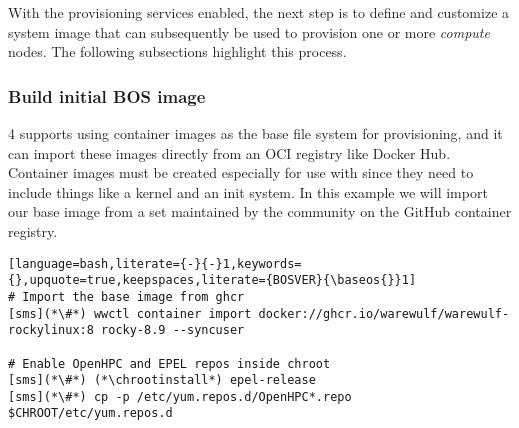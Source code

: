 With the provisioning services enabled, the next step is to define and
customize a system image that can subsequently be used to provision one or more
{\em compute} nodes. The following subsections highlight this process.

\subsubsection{Build initial BOS image} \label{sec:assemble_bos}
\Warewulf{} 4 supports using container images as the base file system for 
provisioning, and it can import these images directly from an OCI registry like
Docker Hub. Container images must be created especially for use with \Warewulf{}
since they need to include things like a kernel and an init system. In this 
example we will import our base image from a set maintained by the \Warewulf{}
community on the GitHub container registry.

\begin{lstlisting}[language=bash,literate={-}{-}1,keywords={},upquote=true,keepspaces,literate={BOSVER}{\baseos{}}1]
# Import the base image from ghcr
[sms](*\#*) wwctl container import docker://ghcr.io/warewulf/warewulf-rockylinux:8 rocky-8.9 --syncuser

# Enable OpenHPC and EPEL repos inside chroot
[sms](*\#*) (*\chrootinstall*) epel-release
[sms](*\#*) cp -p /etc/yum.repos.d/OpenHPC*.repo $CHROOT/etc/yum.repos.d
\end{lstlisting}
